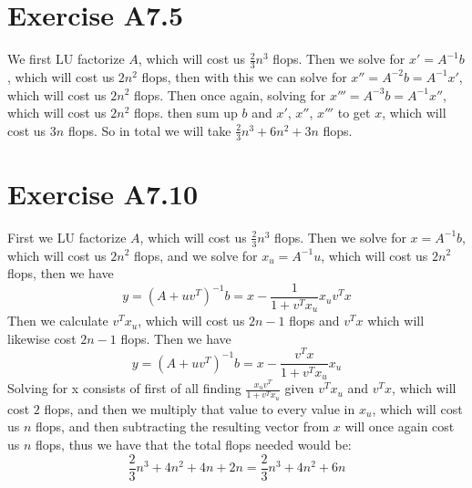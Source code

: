 \section*{Exercise A7.5}
We first LU factorize $A$, which will cost us $\frac{2}{3}n^3$ flops. 
Then we solve for $x'=A^{-1}b$, which will cost us $2n^2$ flops, then with this we can
solve for $x''=A^{-2}b=A^{-1}x'$, which will cost us $2n^2$ flops.
Then once again, solving for $x'''=A^{-3}b=A^{-1}x''$, which will cost us $2n^2$ flops.
then sum up $b$ and $x'$, $x''$, $x'''$ to get $x$, which will cost us 
$3n$ flops. So in total we will take $\boxed{\frac{2}{3}n^3+6n^2+3n}$ flops.
\section*{Exercise A7.10}
First we LU factorize $A$, which will cost us $\frac{2}{3}n^3$ flops. 
Then we solve for $x=A^{-1}b$, which will cost us $2n^2$ flops, and we solve
for $x_u=A^{-1}u$, which will cost us $2n^2$ flops, then we have
$$y=(A+uv^T)^{-1}b=x-\frac{1}{1+v^Tx_u}x_uv^Tx$$
Then we calculate $v^Tx_u$, which will cost us $2n-1$ flops and 
$v^Tx$ which will likewise cost $2n-1$ flops. Then we have
$$y=(A+uv^T)^{-1}b=x-\frac{v^Tx}{1+v^Tx_u}x_u$$
Solving for x consists of first of all finding $\frac{x_uv^T}{1+v^Tx_u}$ given 
$v^Tx_u$ and $v^Tx$, which will cost $2$ flops, and then we multiply that value 
to every value in $x_u$, which will cost us $n$ flops, and then subtracting
the resulting vector from $x$ will once again cost us $n$ flops, 
thus we have that the total flops needed would be:
$$\frac{2}{3}n^3+4n^2+4n+2n=\boxed{\frac{2}{3}n^3+4n^2+6n}$$




  


